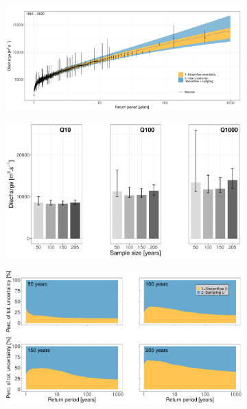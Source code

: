 \documentclass[11pt]{article}
\begin{document}
        \begin{figure}[p]
            \centering
            \begin{subfigure}{0.99\textwidth}
                \centering
                \includegraphics[width=1\linewidth]{Figs/10a-GeV_205years.pdf}
                \caption{}
                \label{subfig:GEV205y}
            \end{subfigure}
            
            \centering
            \begin{subfigure}{0.49\linewidth}
                \centering
                \includegraphics[width=1\linewidth]{Figs/10b-BarplotQuantiles4cases.pdf}
                \caption{}
                \label{subfig:BarplotQuantilesGev}
            \end{subfigure}
            \begin{subfigure}{.49\textwidth}
                \centering  
                \includegraphics[width=\linewidth]{Figs/10c-Ukplot4cases.pdf}
                \caption{}
                \label{subfig:UKplot4cases}
            \end{subfigure}
            

\end{figure}
\end{document}

